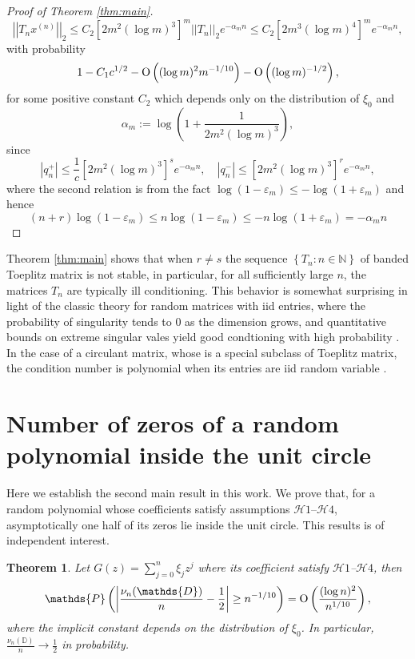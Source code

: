 \documentclass[12pt]{amsart}
\theoremstyle{plain}
\numberwithin{equation}{section}
\newtheorem{theorem}{Theorem}[section]
\renewcommand{\Pr}{\mathbb{P}}
\newcommand{\<}{\langle}
\renewcommand{\>}{\rangle}
\newcommand{\PP}[1]{\left(#1\right)}
\newcommand{\CC}[1]{\left[#1\right]}
\newcommand{\LL}[1]{\left\{#1\right\}}
\newcommand{\N}{\mathds{N}}
\newcommand{\abs}[1]{\left|#1\right|}
\newcommand{\norm}[1]{\left|\left|#1\right|\right|}
\renewcommand{\Pr}[1]{\mathds{P}\left(#1\right)}
\begin{document}
\begin{proof}[Proof of Theorem \ref{thm:main}]
\[
\norm{ T_n x^{(n)} }_2 \leq C_2 \CC{2m^2(\log m)^3}^{m} \norm{T_n}_2 e^{-\alpha_m n} \leq C_2  \CC{2m^{3}(\log m)^{4}}^{m} e^{-\alpha_m n},
\]
with probability 
\[
1 -  C_1c^{1/2} - \textnormal{O}\PP{(\log m)^{2} m^{-1/10}} - \textnormal{O}\PP{(\log m)^{-1/2}},
\]
for some positive constant $C_2$ which depends only on the distribution of $\xi_0$ and
\[
\alpha_m := \log\PP{ 1 + \frac{1}{2m^2(\log m)^3}},
\]
since 
\[
\abs{q^{+}_{n}}  \leq \frac{1}{c}\CC{2m^2(\log m)^3}^{s} e^{-\alpha_m n} ,\quad
\abs{q^{-}_{n}}  \leq \CC{2m^2(\log m)^3}^{r} e^{-\alpha_m n},
\]
where the second relation is from the fact $\log(1- \varepsilon_m)\leq -\log(1+ \varepsilon_m)$ and hence
\[
(n+r)\log(1 - \varepsilon_m) \leq n\log(1 - \varepsilon_m) \leq -n\log(1+ \varepsilon_m) = -\alpha_m n
\]
\end{proof}

Theorem \ref{thm:main} shows that when $r\neq s$ the sequence $\LL{T_n : n\in\N}$ of banded Toeplitz matrix is not stable, in particular, for all sufficiently large $n$, the matrices $T_n$ are typically ill conditioning. This behavior is somewhat surprising in light of the classic theory for random matrices with iid entries, where the probability of singularity tends to $0$ as the dimension grows, and quantitative bounds on extreme singular vales yield good condtioning with high probability \cite{barrera2022asymptotic,livshyts2021smallest,pan2015estimating,rudelson2010non}. In the case of a circulant matrix, whose is a special subclass of Toeplitz matrix, the condition number is polynomial when its entries are iid random variable \cite{barrera2022asymptotic}. 

\section{Number of zeros of a random polynomial inside the unit circle} \label{sec:num.zeros.inside.unit.circle}

Here we establish the second main result in this work. We prove that, for a random polynomial whose coefficients satisfy assumptions $\mathcal{H}1$--$\mathcal{H}4$, asymptotically one half of its zeros lie inside the unit circle. This results is of independent interest.

\begin{theorem}\label{thm:main01}
Let $G(z)=\sum_{j=0}^{n} \xi_j z^j$ where its coefficient satisfy $\mathcal{H}1$--$\mathcal{H}4$, then
\[
\Pr{\abs{\frac{\nu_n(\mathds{D})}{n} - \frac{1}{2} } \geq n^{-1/10} } =  \textnormal{O}\PP{ \frac{(\log n)^2}{n^{1/10}} },
\]
where the implicit constant depends on the distribution of $\xi_0$. In particular, $\frac{\nu_n(\mathds{D})}{n} \to \frac{1}{2}$ in probability. 
\end{theorem}
\end{document}
